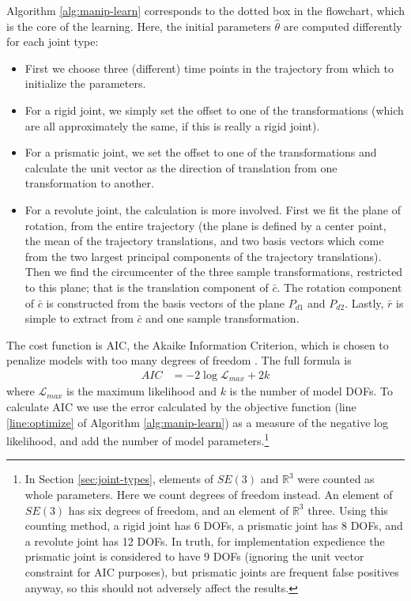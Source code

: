 \documentclass[letterpaper, 10 pt, conference]{ieeeconf}  %
\begin{document}
Algorithm \ref{alg:manip-learn} corresponds to the dotted box in the flowchart, which is the core of the learning. Here, the initial parameters $\hat{\theta}$ are computed differently for each joint type:
\begin{itemize}
  \item First we choose three (different) time points in the trajectory from which to initialize the parameters.
  \item For a rigid joint, we simply set the offset to one of the transformations (which are all approximately the same, if this is really a rigid joint).
  \item For a prismatic joint, we set the offset to one of the transformations and calculate the unit vector as the direction of translation from one transformation to another.
  \item For a revolute joint, the calculation is more involved. First we fit the plane of rotation, from the entire trajectory (the plane is defined by a center point, the mean of the trajectory translations, and two basis vectors which come from the two largest principal components of the trajectory translations). Then we find the circumcenter of the three sample transformations, restricted to this plane; that is the translation component of $\bar{c}$. The rotation component of $\bar{c}$ is constructed from the basis vectors of the plane $P_{d1}$ and $P_{d2}$. Lastly, $\bar{r}$ is simple to extract from $\bar{c}$ and one sample transformation.
\end{itemize}

The cost function is AIC, the Akaike Information Criterion, which is chosen to penalize models with too many degrees of freedom \cite{Liddle2008}. The full formula is
\begin{align}
  AIC &= -2 \log \mathcal{L}_{max} + 2k
\end{align}
where $\mathcal{L}_{max}$ is the maximum likelihood and $k$ is the number of model DOFs. To calculate AIC we use the error calculated by the objective function (line \ref{line:optimize} of Algorithm \ref{alg:manip-learn}) as a measure of the negative log likelihood, and add the number of model parameters.\footnote{In Section \ref{sec:joint-types}, elements of $SE(3)$ and $\mathbb{R}^3$ were counted as whole parameters. Here we count degrees of freedom instead. An element of $SE(3)$ has six degrees of freedom, and an element of $\mathbb{R}^3$ three. Using this counting method, a rigid joint has 6 DOFs, a prismatic joint has 8 DOFs, and a revolute joint has 12 DOFs. In truth, for implementation expedience the prismatic joint is considered to have 9 DOFs (ignoring the unit vector constraint for AIC purposes), but prismatic joints are frequent false positives anyway, so this should not adversely affect the results.}
\end{document}
